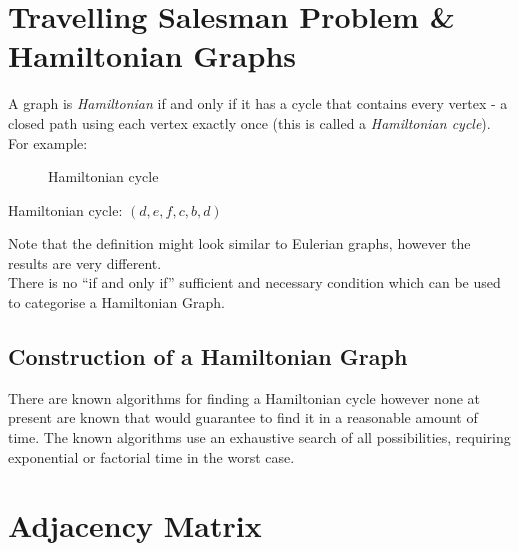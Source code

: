 \section{Travelling Salesman Problem \& Hamiltonian Graphs}
A graph is \textit{Hamiltonian} if and only if it has a cycle that contains every vertex - a closed path using each vertex exactly once (this is called a \textit{Hamiltonian cycle}). For example:

\begin{minipage}{0.5\textwidth}
    \begin{figure}[H]
        \centering
        \caption{Hamiltonian cycle}
    \end{figure}
\end{minipage} \hfill
\begin{minipage}{0.45\textwidth}
Hamiltonian cycle: $(d, e, f, c, b, d)$
\end{minipage} \vspace{0.5em}

Note that the definition might look similar to Eulerian graphs, however the results are very different.\\

There is no ``if and only if'' sufficient and necessary condition which can be used to categorise a Hamiltonian Graph.

\subsection{Construction of a Hamiltonian Graph}
There are known algorithms for finding a Hamiltonian cycle however none at present are known that would guarantee to find it in a reasonable amount of time. The known algorithms use an exhaustive search of all possibilities, requiring exponential or factorial time in the worst case. 

\section{Adjacency Matrix}